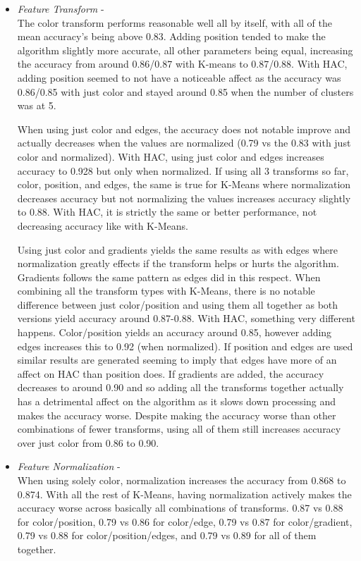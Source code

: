 \documentclass[12pt]{article}
\begin{document}
\begin{itemize}
	\item \textit{Feature Transform} - \\
		The color transform performs reasonable well all by itself, with all of the mean accuracy's being above 0.83. Adding position tended to make the algorithm slightly more accurate, all other parameters being equal, increasing the accuracy from around  0.86/0.87 with K-means to 0.87/0.88. With HAC, adding position seemed to not have a noticeable affect as the accuracy was 0.86/0.85 with just color and stayed around 0.85 when the number of clusters was at 5. 
		
		When using just color and edges, the accuracy does not notable improve and actually decreases when the values are normalized (0.79 vs the 0.83 with just color and normalized). With HAC, using just color and edges increases accuracy to 0.928 but only when normalized. If using all 3 transforms so far, color, position, and edges, the same is true for K-Means where normalization decreases accuracy but not normalizing the values increases accuracy slightly to 0.88. With HAC, it is strictly the same or better performance, not decreasing accuracy like with K-Means. 
		
		Using just color and gradients yields the same results as with edges where normalization greatly effects if the transform helps or hurts the algorithm. Gradients follows the same pattern as edges did in this respect. When combining all the transform types with K-Means, there is no notable difference between just color/position and using them all together as both versions yield accuracy around 0.87-0.88. With HAC, something very different happens. Color/position yields an accuracy around 0.85, however adding edges increases this to 0.92 (when normalized). If position and edges are used similar results are generated seeming to imply that edges have more of an affect on HAC than position does. If gradients are added, the accuracy decreases to around 0.90 and so adding all the transforms together actually has a detrimental affect on the algorithm as it slows down processing and makes the accuracy worse. Despite making the accuracy worse than other combinations of fewer transforms, using all of them still increases accuracy over just color from 0.86 to 0.90.
	
	\item \textit{Feature Normalization} - \\
		When using solely color, normalization increases the accuracy from 0.868 to 0.874. With all the rest of K-Means, having normalization actively makes the accuracy worse across basically all combinations of transforms. 0.87 vs 0.88 for color/position, 0.79 vs 0.86 for color/edge, 0.79 vs 0.87 for color/gradient, 0.79 vs 0.88 for color/position/edges, and 0.79 vs 0.89 for all of them together. 
		

\end{itemize}
\end{document}
